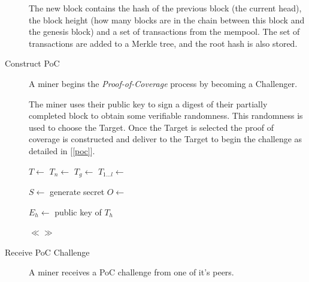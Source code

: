 \documentclass[10pt, nonatbib, nocopyrightspace, reprint]{sigplanconf}
\newenvironment{protocol}[2]{
  \begin{algorithm}[!htb]
    \DontPrintSemicolon
    \caption{#1}\label{#2}
}{
  \end{algorithm}
  \FloatBarrier
}
\newcommand{\secref}[1]{[\autoref{#1}]}
\begin{document}
\begin{description}
    The new block contains the hash of the previous block (the current head), the block height (how many blocks are in the chain between this block and the genesis block) and a set of transactions from the mempool. The set of transactions are added to a Merkle tree, and the root hash is also stored.

  \item [Construct PoC] A miner begins the \emph{Proof-of-Coverage} process by becoming a Challenger.

    The miner uses their public key to sign a digest of their partially completed block to obtain some verifiable randomness. This randomness is used to choose the Target. Once the Target is selected the proof of coverage is constructed and deliver to the Target to begin the challenge as detailed in \secref{poc}.


    \begin{protocol}{Miner PoC Challenge}{proto:miner.poc.challenge}

       {
        $T \leftarrow $ \;
        $T_n \leftarrow $ \;
        $T_g \leftarrow $ \;
        $T_{1 \dots l} \leftarrow $ \;

        $S \leftarrow $ generate secret \;
        $O \leftarrow $  \;
      }

       {
        $E_h \leftarrow $ public key of $T_h$\;

         {
          \lCase{[]} { $ \ll \gg $}
        }
      }
    \end{protocol}



  \item [Receive PoC Challenge] A miner receives a PoC challenge from one of it's peers.


\end{description}
\end{document}
